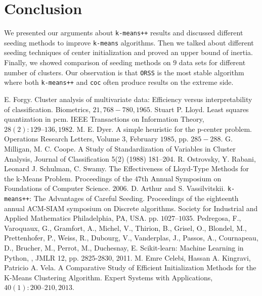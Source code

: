 \documentclass[twoside, 11pt]{article}
\begin{document}
	\section{Conclusion}
	We presented our arguments about \texttt{k-means++} results and discussed different seeding methods to improve \texttt{k-means} algorithms. Then we talked about different seeding techniques of center initialization and proved an upper bound of inertia. Finally, we showed comparison of seeding methods on $9$ data sets for different number of clusters. Our observation is that \texttt{ORSS} is the most stable algorithm where both \texttt{k-means++} and \texttt{coc} often produce results on the extreme side.
	\begin{thebibliography}{99}
		 E. Forgy. Cluster analysis of multivariate data: Efficiency versus interpretability of classification. Biometrics, $21, 768-780, 1965$.
		 Stuart P. Lloyd. Least squares quantization in pcm. IEEE Transactions on Information Theory, $28(2):129–136, 1982$.
		 M. E. Dyer. A simple heuristic for the p-center problem. Operations Research Letters, Volume $3$, February $1985$, pp. $285-288$.
		 G. Milligan, M. C. Coope. A Study of Standardization of Variables in Cluster Analysis, Journal of Classification 5(2) (1988) 181–204.
		 R. Ostrovsky, Y. Rabani, Leonard J. Schulman, C. Swamy. The Effectiveness of Lloyd-Type Methods for the k-Means Problem. Proceedings of the $47$th Annual Symposium on Foundations of Computer Science. $2006$.
		 D. Arthur and S. Vassilvitskii. \texttt{k-means++}: The Advantages of Careful Seeding. Proceedings of the eighteenth annual ACM-SIAM symposium on Discrete algorithms. Society for Industrial and Applied Mathematics Philadelphia, PA, USA. pp. $1027–1035$.
		 Pedregosa, F., Varoquaux, G., Gramfort, A., Michel, V., Thirion, B., Grisel, O., Blondel, M., Prettenhofer, P., Weiss, R., Dubourg, V., Vanderplas, J., Passos, A., Cournapeau, D., Brucher, M., Perrot, M., Duchesnay, E. Scikit-learn: Machine Learning in Python, , JMLR 12, pp. 2825-2830, 2011.
		 M. Emre Celebi, Hassan A. Kingravi, Patricio A. Vela. A Comparative Study of Efficient Initialization Methods for the K-Means Clustering Algorithm. Expert Systems with Applications, $40(1): 200–210, 2013$.
	\end{thebibliography}
\end{document}
